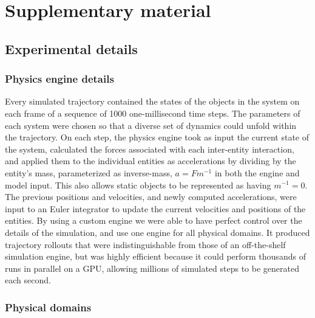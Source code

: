 \section{Supplementary material}

\subsection{Experimental details}
\subsubsection{Physics engine details}
Every simulated trajectory contained the states of the objects in the
system on each frame of a sequence of 1000 one-millisecond time
steps. The parameters of each system were chosen so that a diverse set
of dynamics could unfold within the trajectory. On each step, the
physics engine took as input the current state of the system,
calculated the forces associated with each inter-entity interaction,
and applied them to the individual entities as accelerations by
dividing by the entity's mass, parameterized as inverse-mass, $a = F
m^{-1}$ in both the engine and model input. This also allows static
objects to be represented as having $m^{-1}=0$. The previous positions
and velocities, and newly computed accelerations, were input to an
Euler integrator to update the current velocities and positions of the
entities. By using a custom engine we were able to have perfect
control over the details of the simulation, and use one engine for all
physical domains. It produced trajectory rollouts that were
indistinguishable from those of an off-the-shelf simulation engine,
but was highly efficient because it could perform thousands of runs in
parallel on a GPU, allowing millions of simulated steps to be
generated each second.

\subsubsection{Physical domains}

